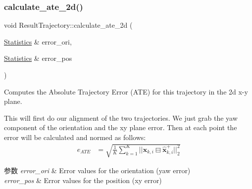 \subsubsection{\texorpdfstring{calculate\+\_\+ate\+\_\+2d()}{calculate\_ate\_2d()}}
{\footnotesize\ttfamily void Result\+Trajectory\+::calculate\+\_\+ate\+\_\+2d (\begin{DoxyParamCaption}\item[{\hyperlink{structov__eval_1_1Statistics}{Statistics} \&}]{error\+\_\+ori,  }\item[{\hyperlink{structov__eval_1_1Statistics}{Statistics} \&}]{error\+\_\+pos }\end{DoxyParamCaption})}



Computes the Absolute Trajectory Error (A\+TE) for this trajectory in the 2d x-\/y plane. 

This will first do our alignment of the two trajectories. We just grab the yaw component of the orientation and the xy plane error. Then at each point the error will be calculated and normed as follows\+: \begin{align*} e_{ATE} &= \sqrt{ \frac{1}{K} \sum_{k=1}^{K} ||\mathbf{x}_{k,i} \boxminus \hat{\mathbf{x}}^+_{k,i}||^2_{2} } \end{align*}


\begin{DoxyParams}{参数}
{\em error\+\_\+ori} & Error values for the orientation (yaw error) \\
\hline
{\em error\+\_\+pos} & Error values for the position (xy error) \\
\hline
\end{DoxyParams}
\mbox{\label{classov__eval_1_1ResultTrajectory_a8c8675c3a9ebc8415e41c38175691e46}} 
